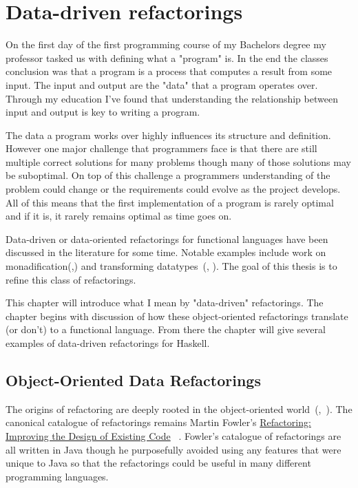 \chapter{Data-driven refactorings}


On the first day of the first programming course of my Bachelors degree my professor tasked us with defining what a "program" is. In the end the classes conclusion was that a program is a process that computes a result from some input. The input and output are the "data" that a program operates over. Through my education I've found that understanding the relationship between input and output is key to writing a program.

The data a program works over highly influences its structure and definition. However one major challenge that programmers face is that there are still multiple correct solutions for many problems though many of those solutions may be suboptimal. On top of this challenge a programmers understanding of the problem could change or the requirements could evolve as the project develops. All of this means that the first implementation of a program is rarely optimal and if it is, it rarely remains optimal as time goes on. 

Data-driven or data-oriented refactorings for functional languages have been discussed in the literature for some time. Notable examples include work on monadification(\cite{monadification},\cite{monadSurvey}) and transforming datatypes~(\cite{datatypeTransformation}, \cite{brownThesis}).  The goal of this thesis is to refine this class of refactorings.

This chapter will introduce what I mean by "data-driven" refactorings. The chapter begins with discussion of how these object-oriented refactorings translate (or don't) to a functional language. From there the chapter will give several examples of data-driven refactorings for Haskell.

\section{Object-Oriented Data Refactorings}\label{ooRefs}

The origins of refactoring are deeply rooted in the object-oriented world~(\cite{programRestructuring},~\cite{refactOOFrameworks}). The canonical catalogue of refactorings remains Martin Fowler's \underline{Refactoring: Improving the Design of Existing Code} ~\citep{fowler}. Fowler's catalogue of refactorings are all written in Java though he purposefully avoided using any features that were unique to Java so that the refactorings could be useful in many different programming languages.

